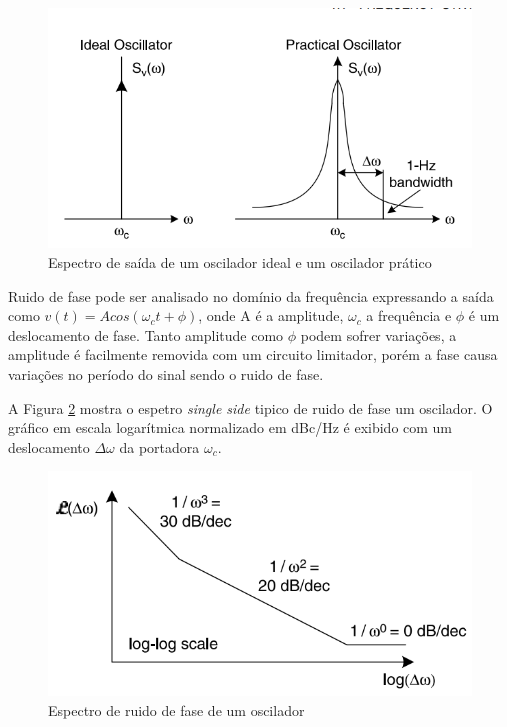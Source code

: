 \begin{figure}[h!]
	\caption{Espectro de saída de um oscilador ideal e um oscilador prático}
	\begin{center}
			\includegraphics[scale=0.8]{img/phase_noise_ideal_practical.png}
		\end{center}
	\label{fig:phase_noise_ideal_practical}
\end{figure}

Ruido de fase pode ser analisado no domínio da frequência expressando a saída como $v(t) = A cos(\omega_c t + \phi)$, onde A é a amplitude, $\omega_c$ a frequência e $\phi$ é um deslocamento de fase. Tanto amplitude como $\phi$ podem sofrer variações, a amplitude é facilmente removida com um circuito limitador, porém a fase causa variações no período do sinal sendo o ruido de fase.


A Figura \ref{fig:phase_noise_spectrum} mostra o espetro \textit{single side}  tipico de ruido de fase um oscilador. O gráfico em escala logarítmica normalizado em dBc/Hz é exibido com um deslocamento $\Delta \omega$ da portadora $\omega_c$. 

\begin{figure}[h!]
	\caption{Espectro de ruido de fase de um oscilador}
	\begin{center}
		\includegraphics[scale=0.8]{img/phase_noise_spectrum.png}
	\end{center}
	\label{fig:phase_noise_spectrum}
\end{figure}


